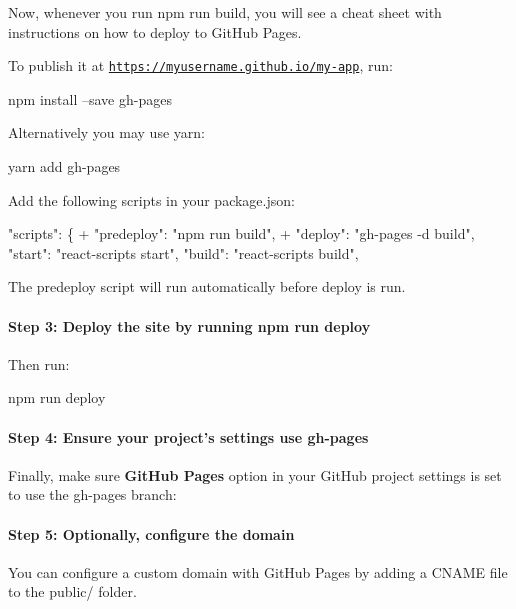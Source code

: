 Now, whenever you run {\ttfamily npm run build}, you will see a cheat sheet with instructions on how to deploy to Git\+Hub Pages.

To publish it at \href{https://myusername.github.io/my-app}{\tt https\+://myusername.\+github.\+io/my-\/app}, run\+:


\begin{DoxyCode}
npm install --save gh-pages
\end{DoxyCode}


Alternatively you may use {\ttfamily yarn}\+:


\begin{DoxyCode}
yarn add gh-pages
\end{DoxyCode}


Add the following scripts in your {\ttfamily package.\+json}\+:


\begin{DoxyCode}
  "scripts": \{
+   "predeploy": "npm run build",
+   "deploy": "gh-pages -d build",
    "start": "react-scripts start",
    "build": "react-scripts build",
\end{DoxyCode}


The {\ttfamily predeploy} script will run automatically before {\ttfamily deploy} is run.

\paragraph*{Step 3\+: Deploy the site by running {\ttfamily npm run deploy}}

Then run\+:


\begin{DoxyCode}
npm run deploy
\end{DoxyCode}


\paragraph*{Step 4\+: Ensure your project’s settings use {\ttfamily gh-\/pages}}

Finally, make sure {\bfseries Git\+Hub Pages} option in your Git\+Hub project settings is set to use the {\ttfamily gh-\/pages} branch\+:



\paragraph*{Step 5\+: Optionally, configure the domain}

You can configure a custom domain with Git\+Hub Pages by adding a {\ttfamily C\+N\+A\+ME} file to the {\ttfamily public/} folder.

